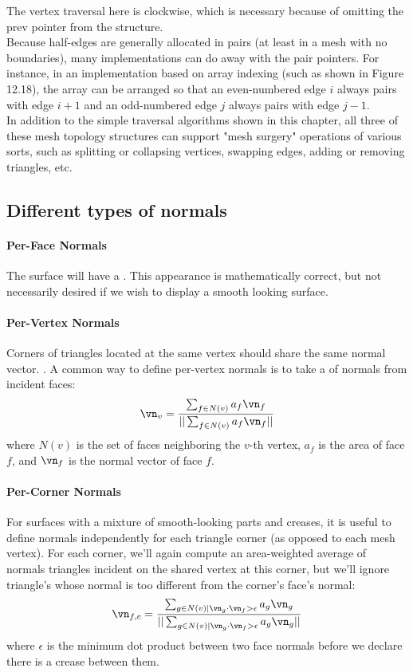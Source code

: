 \documentclass[11pt]{article}
\numberwithin{equation}{section}
\begin{document}
The vertex traversal here is clockwise, which is necessary because of omitting the prev pointer from the structure.\\
Because half-edges are generally allocated in pairs (at least in a mesh with no boundaries), many implementations can do away with the pair pointers. For instance, in an implementation based on array indexing (such as shown in Figure 12.18), the array can be arranged so that an even-numbered edge $i$ always pairs with edge $i + 1$ and an odd-numbered edge $j$ always pairs with edge $j-1$.\\
In addition to the simple traversal algorithms shown in this chapter, all three of these mesh topology structures can support "mesh surgery" operations of various sorts, such as splitting or collapsing vertices, swapping edges, adding or removing triangles, etc.
\subsection{Different types of normals}
\paragraph{Per-Face Normals}
The surface will have a . This appearance is mathematically correct, but not necessarily desired if we wish to display a smooth looking surface.
\paragraph{Per-Vertex Normals}
Corners of triangles located at the same vertex should share the same normal vector. . A common way to define per-vertex normals is to take a  of normals from incident faces:
\begin{equation}
	\vn_{v} = \frac{\sum_{f\in N(v)} a_f\vn_{f}}{||\sum_{f\in N(v)} a_f\vn_{f}||}
\end{equation}
where $N(v)$ is the set of faces neighboring the $v$-th vertex, $a_f$ is the area of face $f$, and $\vn_f$ is the normal vector of face $f$.

\paragraph{Per-Corner Normals}
For surfaces with a mixture of smooth-looking parts and creases, it is useful to define normals independently for each triangle corner (as opposed to each mesh vertex). For each corner, we'll again compute an area-weighted average of normals triangles incident on the shared vertex at this corner, but we'll ignore triangle's whose normal is too different from the corner's face's normal:
\begin{equation}
	\vn_{f,c} = \frac{\sum_{g \in N(v)|\vn_{g}\cdot \vn_{f}>\epsilon} a_g\vn_{g}}{||\sum_{g \in N(v)|\vn_{g}\cdot \vn_{f}>\epsilon} a_g\vn_{g}||}
\end{equation}
where $\epsilon$ is the minimum dot  product between two face normals before we declare there is a crease between them.
\end{document}
